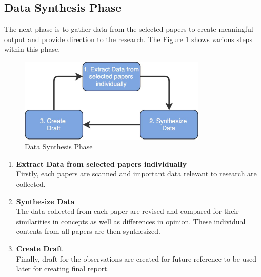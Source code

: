 \subsection{Data Synthesis Phase}\label{section:context/approach/data_synthesis_phase}
The next phase is to gather data from the selected papers to create meaningful output and provide direction to the research. The Figure \ref{fig:context/data_synthesis_phase} shows various steps within this phase.
\begin{figure}[H]
\begin{center}
\includegraphics[width=0.8\textwidth]{figures/introduction_data_synthesis_phase}
\caption{Data Synthesis Phase}
\label{fig:context/data_synthesis_phase}
\end{center}
\end{figure}

\begin{enumerate}
\item \textbf{Extract Data from selected papers individually}\\
Firstly, each papers are scanned and important data relevant to research are collected.
\item \textbf{Synthesize Data}\\
The data collected from each paper are revised and compared for their similarities in concepts as well as differences in opinion. These individual contents from all papers are then synthesized.
\item \textbf{Create Draft}\\
Finally, draft for the observations are created for future reference to be used later for creating final report.
\end{enumerate}


